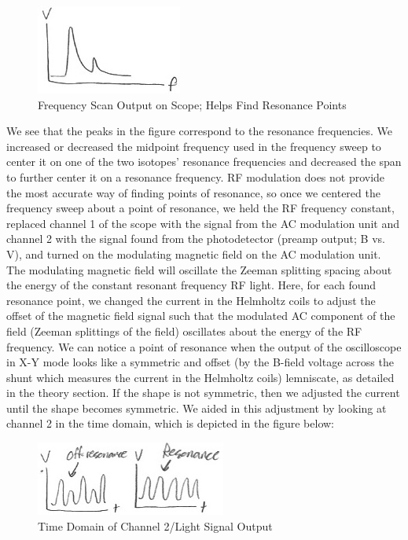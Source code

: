 \documentclass{article}
\begin{document}
    \begin{figure}[H] %
        \centering
        \includegraphics[scale = 0.4]{15.jpg}
        \caption{Frequency Scan Output on Scope; Helps Find Resonance Points}
        \label{fig:my_label}
    \end{figure}
    \indent We see that the peaks in the figure correspond to the resonance frequencies. We increased or decreased the midpoint frequency used in the frequency sweep to center it on one of the two isotopes' resonance frequencies and decreased the span to further center it on a resonance frequency. RF modulation does not provide the most accurate way of finding points of resonance, so once we centered the frequency sweep about a point of resonance, we held the RF frequency constant, replaced channel 1 of the scope with the signal from the AC modulation unit and channel 2 with the signal found from the photodetector (preamp output; B vs. V), and turned on the modulating magnetic field on the AC modulation unit. The modulating magnetic field will oscillate the Zeeman splitting spacing about the energy of the constant resonant frequency RF light. Here, for each found resonance point, we changed the current in the Helmholtz coils to adjust the offset of the magnetic field signal such that the modulated AC component of the field (Zeeman splittings of the field) oscillates about the energy of the RF frequency. We can notice a point of resonance when the output of the oscilloscope in X-Y mode looks like a symmetric and offset (by the B-field voltage across the shunt which measures the current in the Helmholtz coils) lemniscate, as detailed in the theory section. If the shape is not symmetric, then we adjusted the current until the shape becomes symmetric. We aided in this adjustment by looking at channel 2 in the time domain, which is depicted in the figure below:
    \begin{figure}[H] %
        \centering
        \includegraphics[scale = 0.4]{17.jpg}
        \caption{Time Domain of Channel 2/Light Signal Output}
        \label{fig:my_label}
    \end{figure}
\end{document}
